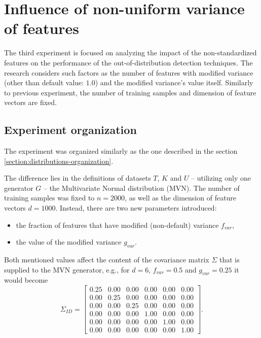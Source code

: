\section{Influence of non-uniform variance of features}
\label{section:variances-experiment}

The third experiment is focused on analyzing the impact of the non-standardized features on the performance of the out-of-distribution detection techniques. The research considers such factors as the number of features with modified variance (other than default value: $1.0$) and the modified variance's value itself. Similarly to previous experiment, the number of training samples and dimension of feature vectors are fixed.

\vspace{2.0em}  %


\subsection{Experiment organization}
\label{section:variances-organization}

The experiment was organized similarly as the one described in the section \ref{section:distributions-organization}.

The difference lies in the definitions of datasets $T$, $K$ and $U$ – utilizing only one generator $G$ – the Multivariate Normal distribution (MVN). The number of training samples was fixed to $n = 2000$, as well as the dimension of feature vectors $d = 1000$. Instead, there are two new parameters introduced:
\vspace{-0.5\baselineskip}
\begin{itemize}
    \item the fraction of features that have modified (non-default) variance $f_{var}$,
    \item the value of the modified variance $g_{var}$.
\end{itemize}

Both mentioned values affect the content of the covariance matrix $\Sigma$ that is supplied to the MVN generator, e.g., for $d = 6$, $f_{var} = 0.5$ and $g_{var} = 0.25$ it would become
\begin{equation}
    \Sigma_{ID}
    =
    \begin{bmatrix}
        \mathbf{0.25} & 0.00 & 0.00 & 0.00 & 0.00 & 0.00 \\
        0.00 & \mathbf{0.25} & 0.00 & 0.00 & 0.00 & 0.00 \\
        0.00 & 0.00 & \mathbf{0.25} & 0.00 & 0.00 & 0.00 \\
        0.00 & 0.00 & 0.00 & \mathbf{1.00} & 0.00 & 0.00 \\
        0.00 & 0.00 & 0.00 & 0.00 & \mathbf{1.00} & 0.00 \\
        0.00 & 0.00 & 0.00 & 0.00 & 0.00 & \mathbf{1.00}
    \end{bmatrix}
    .
    \label{eq:var-example}
\end{equation}

